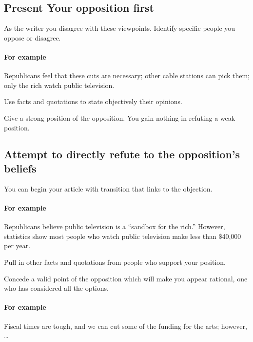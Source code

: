 \subsection{Present Your opposition first} 

As the writer you disagree with these viewpoints. Identify specific people you oppose or disagree. 

\paragraph{For example} Republicans feel that these cuts are necessary; other cable stations can pick them; only the rich watch public television.

\begin{itemize*}
	\item Use facts and quotations to state objectively their opinions.

	\item Give a strong position of the opposition. You gain nothing in refuting a weak position.
\end{itemize*}
 
\subsection{Attempt to directly refute to the opposition's beliefs}

\begin{itemize*}
\item You can begin your article with transition that links to the objection.

\paragraph{For example} Republicans believe public television is a ``sandbox for the rich.'' However, statistics show most people who watch public television make less than \$40,000 per year.

	\item Pull in other facts and quotations from people who support your position.
	\item Concede a valid point of the opposition which will make you appear rational, one who has considered all the options.
	
\paragraph{For example} Fiscal times are tough, and we can cut some of the funding for the arts; however, \ldots
\end{itemize*}

